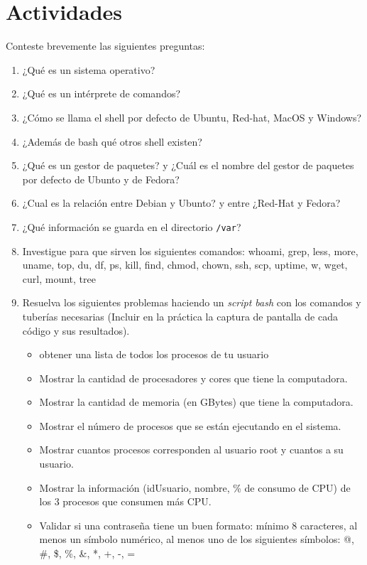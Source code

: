 \documentclass[12pt]{article}
\begin{document}
\section{Actividades}
Conteste brevemente las siguientes preguntas:
\begin{enumerate}
    \item ¿Qué es un sistema operativo?
    \item ¿Qué es un intérprete de comandos?
    \item ¿Cómo se llama el shell por defecto de Ubuntu, Red-hat, MacOS y Windows?
    \item ¿Además de bash qué otros shell existen?
    \item ¿Qué es un gestor de paquetes? y ¿Cuál es el nombre del gestor de paquetes por defecto de Ubunto y de Fedora?
    \item ¿Cual es la relación entre Debian y Ubunto? y entre ¿Red-Hat y Fedora?
    \item ¿Qué información se guarda en el directorio \texttt{/var}?
    \item Investigue para que sirven los siguientes comandos: {\ttfamily whoami, grep, less, more, uname, top, du, df, ps, kill, find, chmod, chown, ssh, scp, uptime, w, wget, curl, mount, tree}
    \item Resuelva los siguientes problemas haciendo un \textit{script bash} con los comandos y tuberías necesarias (Incluir en la práctica la captura de pantalla de cada código y sus resultados).

	\begin{itemize}
		\item obtener una lista de todos los procesos de tu usuario
		\item Mostrar la cantidad de procesadores y cores que tiene la computadora.
		\item Mostrar la cantidad de memoria (en GBytes) que tiene la computadora.
		\item Mostrar el número de procesos que se están ejecutando en el sistema.
		\item Mostrar cuantos procesos corresponden al usuario root y cuantos a su usuario.
		\item Mostrar la información (idUsuario, nombre, \% de consumo de CPU) de los 3 procesos que consumen más CPU.
		\item Validar si una contraseña tiene un buen formato: mínimo 8 caracteres, al menos un símbolo numérico, al menos uno de los siguientes símbolos: {\ttfamily @, \#, \$, \%, \&, *, +, -, =}
		
	\end{itemize}
\end{enumerate}

%
%
\end{document}
